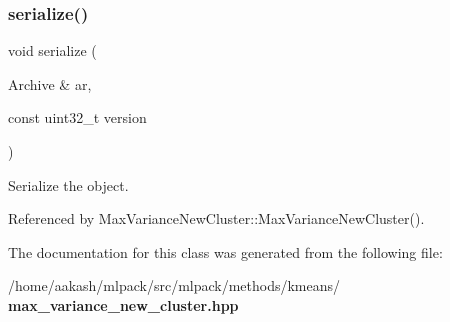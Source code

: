 \subsubsection{serialize()}
{\footnotesize\ttfamily void serialize (\begin{DoxyParamCaption}\item[{Archive \&}]{ar,  }\item[{const uint32\+\_\+t}]{version }\end{DoxyParamCaption})}



Serialize the object. 



Referenced by Max\+Variance\+New\+Cluster\+::\+Max\+Variance\+New\+Cluster().



The documentation for this class was generated from the following file\+:\begin{DoxyCompactItemize}
\item 
/home/aakash/mlpack/src/mlpack/methods/kmeans/\textbf{ max\+\_\+variance\+\_\+new\+\_\+cluster.\+hpp}\end{DoxyCompactItemize}

